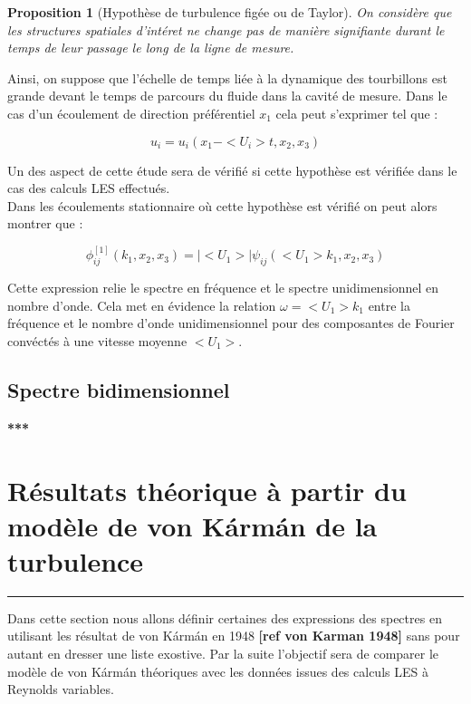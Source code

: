 \documentclass[12pt]{article}
\theoremstyle{plain}
\newtheorem{proposition}[theorem]{Proposition}
\theoremstyle{remark}
\begin{document}
		\begin{proposition}[Hypothèse de turbulence figée ou de Taylor]
			On considère que les structures spatiales d'intéret ne change pas de manière signifiante durant le temps de leur passage le long de la ligne de mesure. 
		\end{proposition}
	
		Ainsi, on suppose que l'échelle de temps liée à la dynamique des tourbillons est grande devant le temps de parcours du fluide dans la cavité de mesure. Dans le cas d'un écoulement de direction préférentiel $x_1$ cela peut s'exprimer tel que :
		
		\begin{equation}
			u_i=u_i(x_1-<U_i>t,x_2,x_3)
		\end{equation}
	
		Un des aspect de cette étude sera de vérifié si cette hypothèse est vérifiée dans le cas des calculs LES effectués. \\
		
		Dans les écoulements stationnaire où cette hypothèse est vérifié on peut alors montrer que :
		
		\begin{equation}
			\phi_{ij}^{[1]}(k_1,x_2,x_3)=|<U_1>|\psi_{ij}(<U_1>k_1,x_2,x_3)
		\end{equation}
	
		Cette expression relie le spectre en fréquence et le spectre unidimensionnel en nombre d'onde. Cela met en évidence la relation $\omega=<U_1>k_1$ entre la fréquence et le nombre d'onde unidimensionnel pour des composantes de Fourier convéctés à une vitesse moyenne $<U_1>$. 
		
		\subsection{Spectre bidimensionnel}
		
		
\begin{center}
	\large {\bf{***}}
\end{center}

\vspace{0.4cm}
\section{Résultats théorique à partir du modèle de von Kármán de la turbulence}
\noindent\rule{\linewidth}{2pt}
\vspace{0.3cm}
		
	Dans cette section nous allons définir certaines des expressions des spectres en utilisant les résultat de von Kármán en 1948 \textbf{[\color{blue}ref von Karman 1948]} sans pour autant en dresser une liste exostive. Par la suite l'objectif sera de comparer le modèle de von Kármán théoriques avec les données issues des calculs LES à Reynolds variables. \\
	
\end{document}
